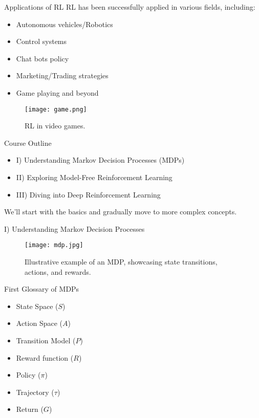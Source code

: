 \documentclass{beamer}
\begin{document}
\begin{frame}{Applications of RL}
    RL has been successfully applied in various fields, including:
    \begin{itemize}
        \item Autonomous vehicles/Robotics
        \item Control systems
        \item Chat bots policy
        \item Marketing/Trading strategies
        \item Game playing and beyond
    \end{itemize}
    \begin{figure}
        \centering
        \texttt{[image: game.png]}
        \caption{RL in video games.}
    \end{figure}
\end{frame}


\begin{frame}{Course Outline}
    \begin{itemize}
        \item I) Understanding Markov Decision Processes (MDPs)
        \item II) Exploring Model-Free Reinforcement Learning
        \item III) Diving into Deep Reinforcement Learning
    \end{itemize}
    We'll start with the basics and gradually move to more complex concepts.
\end{frame}


\begin{frame} {I) Understanding Markov Decision Processes}
    \begin{figure}
        \centering
        \texttt{[image: mdp.jpg]}
        \caption{Illustrative example of an MDP, showcasing state transitions, actions, and rewards.}
    \end{figure}
\end{frame}

\begin{frame}{First Glossary of MDPs}
    \begin{itemize}
        \item State Space ($S$)
        \item Action Space ($A$)
        \item Transition Model ($P$)
        \item Reward function ($R$)
        \item Policy ($\pi$)
        \item Trajectory ($\tau$)
        \item Return ($G$)
    \end{itemize}
\end{frame}
\end{document}
